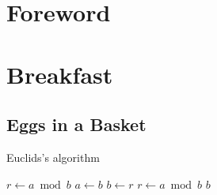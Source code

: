 \documentclass[oneside]{recipe}
\begin{document}
\tableofcontents
\chapter{Foreword}


\chapter{Breakfast}

\section*{Eggs in a Basket}
\begin{algorithm}[H]
\caption{Euclids's algorithm}\label{euclid}
\begin{algorithmic}[1]
   \State $r\gets a\bmod b$
      \State $a\gets b$
      \State $b\gets r$
      \State $r\gets a\bmod b$
   \EndWhile\label{euclidendwhile}
   \State \Return $b$
\EndProcedure
\end{algorithmic}
\end{algorithm}
\end{document}
